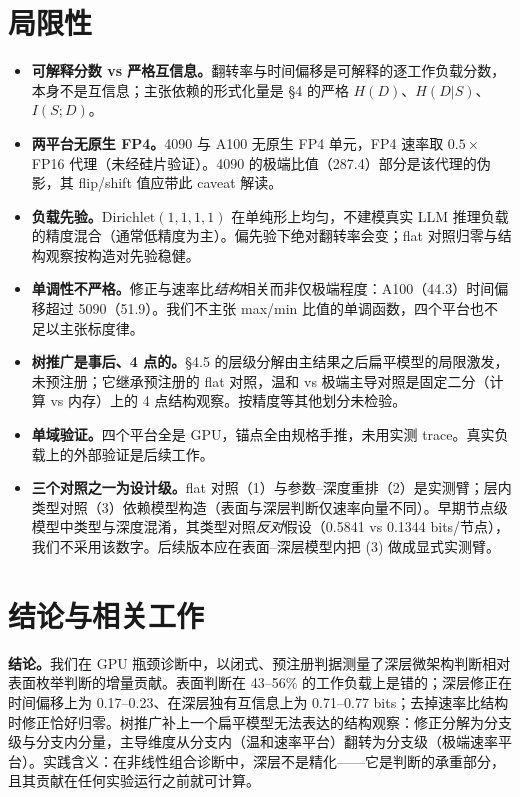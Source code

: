 \documentclass[12pt]{ctexart}
\begin{document}
\section{局限性}\label{limitations}

\begin{itemize}
  \item \textbf{可解释分数 vs 严格互信息。}翻转率与时间偏移是可解释的逐工作负载分数，本身不是互信息；主张依赖的形式化量是 §4 的严格 $H(D)$、$H(D|S)$、$I(S;D)$。
  \item \textbf{两平台无原生 FP4。}4090 与 A100 无原生 FP4 单元，FP4 速率取 $0.5 \times$ FP16 代理（未经硅片验证）。4090 的极端比值（287.4）部分是该代理的伪影，其 flip/shift 值应带此 caveat 解读。
  \item \textbf{负载先验。}$\text{Dirichlet}(1,1,1,1)$ 在单纯形上均匀，不建模真实 LLM 推理负载的精度混合（通常低精度为主）。偏先验下绝对翻转率会变；flat 对照归零与结构观察按构造对先验稳健。
  \item \textbf{单调性不严格。}修正与速率比\emph{结构}相关而非仅极端程度：A100（44.3）时间偏移超过 5090（51.9）。我们不主张 max/min 比值的单调函数，四个平台也不足以主张标度律。
  \item \textbf{树推广是事后、4 点的。}§4.5 的层级分解由主结果之后扁平模型的局限激发，未预注册；它继承预注册的 flat 对照，温和 vs 极端主导对照是固定二分（计算 vs 内存）上的 4 点结构观察。按精度等其他划分未检验。
  \item \textbf{单域验证。}四个平台全是 GPU，锚点全由规格手推，未用实测 trace。真实负载上的外部验证是后续工作。
  \item \textbf{三个对照之一为设计级。}flat 对照（1）与参数--深度重排（2）是实测臂；层内类型对照（3）依赖模型构造（表面与深层判断仅速率向量不同）。早期节点级模型中类型与深度混淆，其类型对照\emph{反对}假设（0.5841 vs 0.1344 bits/节点），我们不采用该数字。后续版本应在表面--深层模型内把 (3) 做成显式实测臂。
\end{itemize}

\section{结论与相关工作}\label{conclusion}

\textbf{结论。}我们在 GPU 瓶颈诊断中，以闭式、预注册判据测量了深层微架构判断相对表面枚举判断的增量贡献。表面判断在 43--56\% 的工作负载上是错的；深层修正在时间偏移上为 0.17--0.23、在深层独有互信息上为 0.71--0.77 bits；去掉速率比结构时修正恰好归零。树推广补上一个扁平模型无法表达的结构观察：修正分解为分支级与分支内分量，主导维度从分支内（温和速率平台）翻转为分支级（极端速率平台）。实践含义：在非线性组合诊断中，深层不是精化——它是判断的承重部分，且其贡献在任何实验运行之前就可计算。
\end{document}
